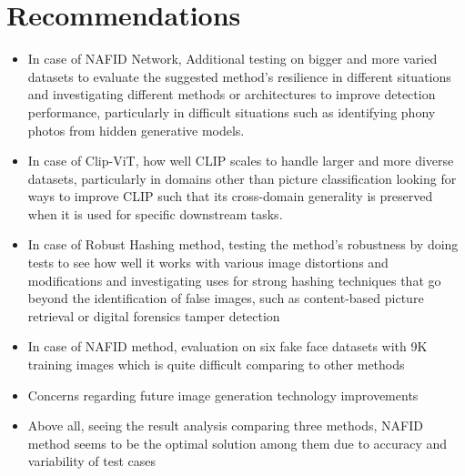 \documentclass[a4paper,14pt]{report}
\begin{document}
\section{Recommendations}
\vspace{0.5cm}
\begin{itemize}
    \item In case of NAFID Network, Additional testing on bigger and more varied datasets to evaluate the suggested method's resilience in different situations and investigating different methods or architectures to improve detection performance, particularly in difficult situations such as identifying phony photos from hidden generative models.
    \vspace{0.5cm}
    \item In case of Clip-ViT, how well CLIP scales to handle larger and more diverse datasets, particularly in domains other than picture classification looking for ways to improve CLIP such that its cross-domain generality is preserved when it is used for specific downstream tasks.
    \vspace{0.5cm}
    \item In case of Robust Hashing method, testing the method's robustness by doing tests to see how well it works with various image distortions and modifications and investigating uses for strong hashing techniques that go beyond the identification of false images, such as content-based picture retrieval or digital forensics tamper detection
    \vspace{0.5cm}
    \item In case of NAFID method, evaluation on six fake face datasets with 9K training images which is quite difficult comparing to other methods
    \vspace{0.5cm}
    \item Concerns regarding future image generation technology improvements
    \vspace{0.5cm}
    \item Above all, seeing the result analysis comparing three methods, NAFID method seems to be the optimal solution among them due to accuracy and variability of test cases
\end{itemize}
\end{document}
